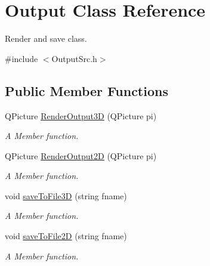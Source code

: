 \hypertarget{classOutput}{}\section{Output Class Reference}
\label{classOutput}


Render and save class.  




{\ttfamily \#include $<$Output\+Src.\+h$>$}

\subsection*{Public Member Functions}
\begin{DoxyCompactItemize}
\item 
Q\+Picture \hyperlink{classOutput_aac99693b73661bf4af821aa5d32094ea}{Render\+Output3D} (Q\+Picture pi)
\begin{DoxyCompactList}\small\item\em A Member function. \end{DoxyCompactList}\item 
Q\+Picture \hyperlink{classOutput_aabbc20a5012e08ef1d242c2800ba8421}{Render\+Output2D} (Q\+Picture pi)
\begin{DoxyCompactList}\small\item\em A Member function. \end{DoxyCompactList}\item 
void \hyperlink{classOutput_a23f2365e8a4f60a0845de5e637266588}{save\+To\+File3D} (string fname)
\begin{DoxyCompactList}\small\item\em A Member function. \end{DoxyCompactList}\item 
void \hyperlink{classOutput_ae97e0cb97e7d7b5a8d2b044319a2f5b9}{save\+To\+File2D} (string fname)
\begin{DoxyCompactList}\small\item\em A Member function. \end{DoxyCompactList}\end{DoxyCompactItemize}
